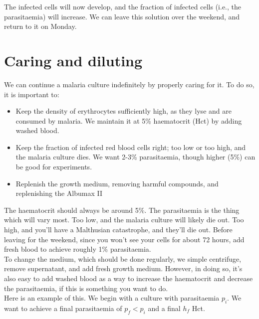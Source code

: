\documentclass{article}
\begin{document}
The infected cells will now develop, and the fraction of infected cells (i.e., the parasitaemia) will increase. We can leave this solution over the weekend, and return to it on Monday.\\

\newpage
\section{Caring and diluting}

We can continue a malaria culture indefinitely by properly caring for it. To do so, it is important to:

\begin{itemize}
	\item Keep the density of erythrocytes sufficiently high, as they lyse and are consumed by malaria. We maintain it at 5\% haematocrit (Hct) by adding washed blood.
	\item Keep the fraction of infected red blood cells right; too low or too high, and the malaria culture dies. We want 2-3\% parasitaemia, though higher (5\%) can be good for experiments.
	\item Replenish the growth medium, removing harmful compounds, and replenishing the Albumax II
\end{itemize}

The haematocrit should always be around 5\%. The parasitaemia is the thing which will vary most. Too low, and the malaria culture will likely die out. Too high, and you'll have a Malthusian catastrophe, and they'll die out. Before leaving for the weekend, since you won't see your cells for about 72 hours, add fresh blood to achieve roughly 1\% parasitaemia.\\

To change the medium, which should be done regularly, we simple centrifuge, remove supernatant, and add fresh growth medium. However, in doing so, it's also easy to add washed blood as a way to increase the haematocrit and decrease the parasitaemia, if this is something you want to do.\\

Here is an example of this. We begin with a culture with parasitaemia $p_i$. We want to achieve a final parasitaemia of $p_f < p_i$ and a final $h_f$ Hct.
\end{document}
